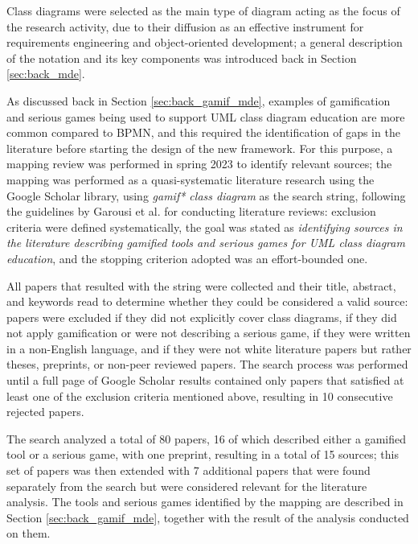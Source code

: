 Class diagrams were selected as the main type of diagram acting as the focus of the research activity, due to their diffusion as an effective instrument for requirements engineering and object-oriented development; a general description of the notation and its key components was introduced back in Section \ref{sec:back_mde}. 



As discussed back in Section \ref{sec:back_gamif_mde}, examples of gamification and serious games being used to support UML class diagram education are more common compared to BPMN, and this required the identification of gaps in the literature before starting the design of the new framework. For this purpose, a mapping review was performed in spring 2023 to identify relevant sources; the mapping was performed as a quasi-systematic literature research using the Google Scholar library, using \textit{gamif* class diagram} as the search string, following the guidelines by Garousi et al. \cite{garousi2019guidelines} for conducting literature reviews:  exclusion criteria were defined systematically, the goal was stated as \textit{identifying sources in the literature describing gamified tools and serious games for UML class diagram education}, and the stopping criterion adopted was an effort-bounded one.

All papers that resulted with the string were collected and their title, abstract, and keywords read to determine whether they could be considered a valid source: papers were excluded if they did not explicitly cover class diagrams, if they did not apply gamification or were not describing a serious game, if they were written in a non-English language, and if they were not white literature papers but rather theses, preprints, or non-peer reviewed papers. The search process was performed until a full page of Google Scholar results contained only papers that satisfied at least one of the exclusion criteria mentioned above, resulting in 10 consecutive rejected papers.

The search analyzed a total of 80 papers, 16 of which described either a gamified tool or a serious game, with one preprint, resulting in a total of 15 sources; this set of papers was then extended with 7 additional papers that were found separately from the search but were considered relevant for the literature analysis. The tools and serious games identified by the mapping are described in Section \ref{sec:back_gamif_mde}, together with the result of the analysis conducted on them.

